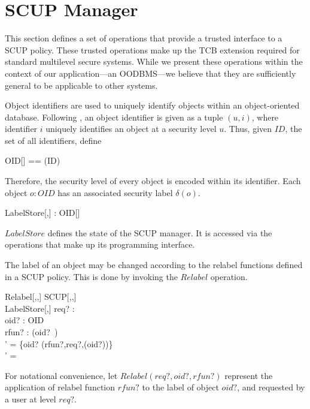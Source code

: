 \section{SCUP Manager} \label{s:skpi}

This section defines a set of operations that provide a trusted
interface to a SCUP policy.  These trusted operations make up the TCB
extension required for standard multilevel secure systems.  While we
present these operations within the context of our application---an
OODBMS---we believe that they are sufficiently general to be applicable
to other systems.

Object identifiers are used to uniquely identify objects within
an object-oriented database. Following \cite{jajodia:mf:90}, 
an object identifier is given as
a tuple $(u,i)$, where identifier $i$ uniquely identifies 
an object at a security level $u$. Thus, given $ID$, the set
of all identifiers, define 
\begin{zed}
OID[\LEVEL] == (\LEVEL \cross ID)
\end{zed}
%
Therefore, the security level of every object is encoded within its
identifier. Each object $o:OID$ 
has an associated security label $\delta(o)$.
\begin{schema}{LabelStore[\LEVEL,\LABEL]}
\delta : OID[\LEVEL] \pfun \LABEL\\
\end{schema}
$LabelStore$ defines the state of the SCUP manager. It is 
accessed via the operations that make up its 
programming interface.  

The label of an object may be changed according to the relabel functions
defined in a SCUP policy.  This is done by invoking the $Relabel$ operation. 
\begin{schema}{Relabel[\LEVEL,\LABEL,\FID]}
SCUP[\LEVEL,\LABEL,\FID] \\
\Delta LabelStore[\LEVEL,\LABEL] \also
req? : \LEVEL \\
oid? : OID\\
rfun? : \FID 
\where
\IF (oid?\in\dom~\delta) \\
\THEN \delta' = \delta \oplus \{oid? \mapsto \Rfun(rfun?,req?,\delta(oid?))\}
\\
\ELSE     \delta' = \delta\\
\end{schema}
For notational convenience, let $Relabel(req?,oid?,rfun?)$ 
represent the application of relabel function $rfun?$ to
the label of object $oid?$, and requested by a user at 
level $req?$. 

